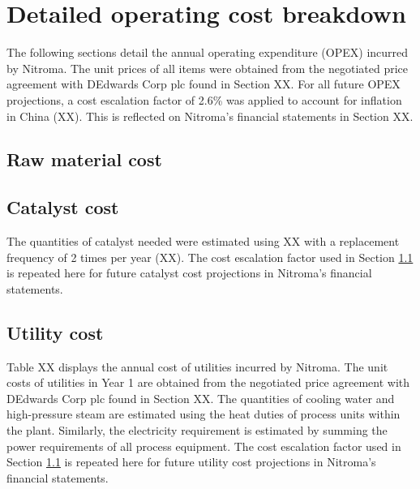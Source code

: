 \section{Detailed operating cost breakdown}
The following sections detail the annual operating expenditure (OPEX) incurred by Nitroma. The unit prices of all items were obtained from the negotiated price agreement with DEdwards Corp plc found in Section XX. For all future OPEX projections, a cost escalation factor of 2.6\% was applied to account for inflation in China (XX). This is reflected on Nitroma’s financial statements in Section XX.

\subsection{Raw material cost}
\label{sec:opex-raw-material}

\subsection{Catalyst cost}
 The quantities of catalyst needed were estimated using XX with a replacement frequency of 2 times per year (XX). The cost escalation factor used in Section \ref{sec:opex-raw-material} is repeated here for future catalyst cost projections in Nitroma’s financial statements.  

\subsection{Utility cost}
Table XX displays the annual cost of utilities incurred by Nitroma. The unit costs of utilities in Year 1 are obtained from the negotiated price agreement with DEdwards Corp plc found in Section XX. The quantities of cooling water and high-pressure steam are estimated using the heat duties of process units within the plant. Similarly, the electricity requirement is estimated by summing the power requirements of all process equipment. The cost escalation factor used in Section \ref{sec:opex-raw-material} is repeated here for future utility cost projections in Nitroma’s financial statements.  

